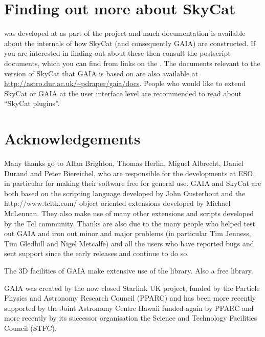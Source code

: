 \documentclass[twoside,11pt,nolof]{starlink}
\begin{document}
\section{Finding out more about SkyCat}
 was
developed at  as part of
the  project and much
documentation is available about the internals of how SkyCat (and
consequently GAIA) are constructed. If you are interested in finding
out about these then consult the postscript documents, which you can
find from links on the . The documents relevant to
the version of SkyCat that GAIA is based on are also available at
\url{http://astro.dur.ac.uk/~pdraper/gaia/docs}. People who would like
to extend SkyCat or GAIA at the user interface level are recommended
to read about ``SkyCat plugins''.


\section{Acknowledgements}

Many thanks go to Allan Brighton, Thomas Herlin, Miguel Albrecht,
Daniel Durand and Peter Biereichel, who are responsible for the
developments at ESO, in particular for making their software free for
general use.
GAIA and SkyCat are both based on the scripting language
 developed by
John Ousterhout and the 
{http://www.tcltk.com/} object oriented extensions developed by
Michael McLennan.
They also make use of many other extensions and scripts developed by
the Tcl community.
Thanks are also due to the many people who helped test out GAIA and
iron out minor and major problems (in particular Tim Jenness, Tim
Gledhill and Nigel Metcalfe) and all the users who have reported bugs
and sent support since the early releases and continue to do so.

The 3D facilities of GAIA make extensive use of the
 library. Also a free
library.

GAIA was created by the now closed Starlink UK project, funded by the Particle
Physics and Astronomy Research Council (PPARC) and has been more recently
supported by the Joint Astronomy Centre Hawaii funded again by PPARC and more
recently by its successor organisation the Science and Technology Facilities
Council (STFC).

\end{document}

